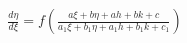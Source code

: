 \documentclass[preview]{standalone}
\begin{document}
\begin{align*}
\frac{d\eta}{d\xi}=f\left(\frac{a\xi+b\eta+ah+bk+c}{a_1\xi+b_1\eta+a_1h+b_1k+c_1}\right)
\end{align*}
\end{document}
